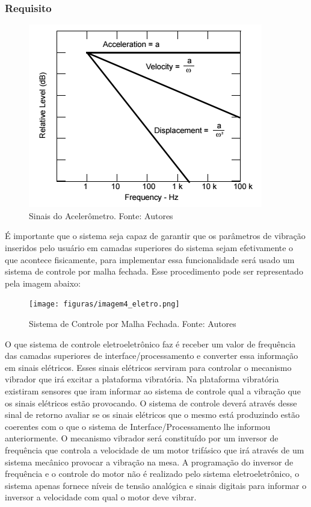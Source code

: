 \subsubsection{Requisito}
\begin{figure}[H]
\centering
\includegraphics[scale=0.5]{figuras/imagem1_eletro.png}
\caption{Sinais do Acelerômetro.  Fonte: Autores}
\label{fig:signal_acel}
\end{figure}
É importante que o sistema seja capaz de garantir que os parâmetros de vibração inseridos pelo usuário em camadas superiores do sistema sejam efetivamente o que acontece fisicamente, para implementar essa funcionalidade será usado um sistema de controle por malha fechada. Esse procedimento pode ser representado pela imagem abaixo:
\begin{figure}[H]
\centering
\texttt{[image: figuras/imagem4\_eletro.png]}
\caption{Sistema de Controle por Malha Fechada.  Fonte: Autores}
\label{fig:malha_fecha}
\end{figure}
O que sistema de controle eletroeletrônico faz é receber um valor de frequência das camadas superiores de interface/processamento e converter essa informação em sinais elétricos. Esses sinais elétricos serviram para controlar o mecanismo vibrador que irá excitar a plataforma vibratória. Na plataforma vibratória existiram sensores que iram informar ao sistema de controle qual a vibração que os sinais elétricos estão provocando. O sistema de controle deverá através desse sinal de retorno avaliar se os sinais elétricos que o mesmo está produzindo estão coerentes com o que o sistema de Interface/Processamento lhe informou anteriormente. O mecanismo vibrador será constituído por um inversor de frequência que controla a velocidade de um motor trifásico que irá através de um sistema mecânico provocar a vibração na mesa. A programação do inversor de frequência e o controle do motor não é realizado pelo sistema eletroeletrônico, o sistema apenas fornece níveis de tensão analógica e sinais digitais para informar o inversor a velocidade com qual o motor deve vibrar.
